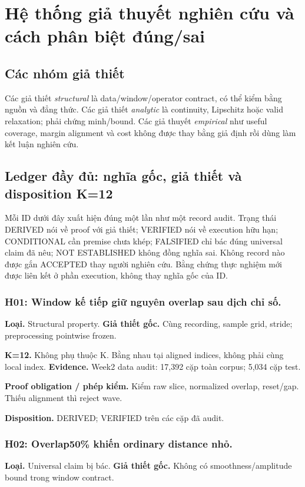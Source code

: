 \documentclass[11pt,a4paper]{article}
\theoremstyle{remark}
\begin{document}
\section{Hệ thống giả thuyết nghiên cứu và cách phân biệt đúng/sai}
\subsection{Các nhóm giả thiết}
Các giả thiết \emph{structural} là data/window/operator contract, có thể
kiểm bằng nguồn và đẳng thức. Các giả thiết \emph{analytic} là continuity,
Lipschitz hoặc valid relaxation; phải chứng minh/bound. Các giả thuyết
\emph{empirical} như useful coverage, margin alignment và cost không được
thay bằng giả định rồi dùng làm kết luận nghiên cứu.

\subsection{Ledger đầy đủ: nghĩa gốc, giả thiết và disposition K=12}
Mỗi ID dưới đây xuất hiện đúng một lần như một record audit. Trạng thái
DERIVED nói về proof với giả thiết; VERIFIED nói về execution hữu hạn;
CONDITIONAL cần premise chưa khép; FALSIFIED chỉ bác đúng universal claim
đã nêu; NOT ESTABLISHED không đồng nghĩa sai. Không record nào được gắn
ACCEPTED thay người nghiên cứu. Bằng chứng thực nghiệm mới được liên kết
ở phần execution, không thay nghĩa gốc của ID.

\subsubsection*{H01: Window kế tiếp giữ nguyên overlap sau dịch chỉ số.}
\textbf{Loại.} Structural property. \textbf{Giả thiết gốc.} Cùng recording, sample grid, stride; preprocessing pointwise frozen.

\textbf{K=12.} Không phụ thuộc K. Bằng nhau tại aligned indices, không phải cùng local index. \textbf{Evidence.} Week2 data audit: 17,392 cặp toàn corpus; 5,034 cặp test.

\textbf{Proof obligation / phép kiểm.} Kiểm raw slice, normalized overlap, reset/gap. Thiếu alignment thì reject wave.

\textbf{Disposition.} DERIVED; VERIFIED trên các cặp đã audit.

\subsubsection*{H02: Overlap50\% khiến ordinary distance nhỏ.}
\textbf{Loại.} Universal claim bị bác. \textbf{Giả thiết gốc.} Không có smoothness/amplitude bound trong window contract.
\end{document}
